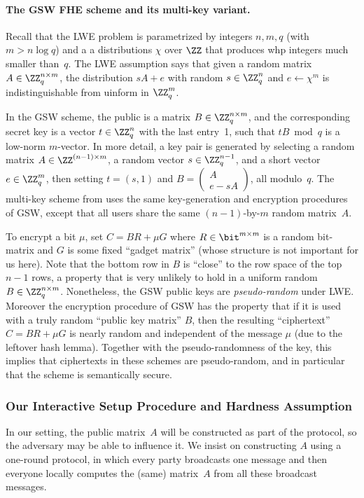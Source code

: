 \paragraph{The GSW FHE scheme and its multi-key variant.}
\fi
Recall that the LWE problem is parametrized by integers $n,m,q$ (with $m>n\log q$) and a a distributions $\chi$ over $\ZZ$ that produces whp integers much smaller than~$q$. The LWE assumption says that given a random matrix $A\in\ZZ_q^{n\times m}$, the distribution $sA+e$ with random $s\in\ZZ_q^n$ and $e\gets\chi^m$ is indistinguishable from uinform in $\ZZ_q^m$.

In the GSW scheme, the public is a matrix $B\in\ZZ_q^{n\times m}$, and the corresponding secret key is a vector $t\in\ZZ_q^n$ with the last entry~1, such that $tB\bmod q$ is a low-norm $m$-vector.
In more detail, a key pair is generated by selecting a random matrix $A \in\ZZ^{(n-1)\times m}$, a random vector $s \in \ZZ_q^{n-1}$, and a short vector $e\in \ZZ_q^{m}$, then setting $t=(s,1)$ and $B = \left(\begin{array}{c}A\\e-sA\end{array}\right)$, all modulo~$q$.
The multi-key scheme from \cite{C:CleMcg15,EC:MukWic16} uses the same key-generation and encryption procedures of GSW, except that all users share the same $(n-1)$-by-$m$ random matrix~$A$.

To encrypt a bit $\mu$, set $C = B R + \mu G$ where $R\in\bit^{m\times m}$ is a random bit-matrix and $G$ is some fixed ``gadget matrix'' (whose structure is not important for us here).
Note that the bottom row in $B$ is ``close'' to the row space of the top $n-1$ rows, a property that is very unlikely to hold in a uniform random $B\in\ZZ_q^{n\times m}$.
Nonetheless, the GSW public keys are \emph{pseudo-random} under LWE. Moreover the encryption procedure of GSW has the property that if it is used with a truly random ``public key matrix'' $B$, then the resulting ``ciphertext'' $C=BR+\mu G$ is nearly random and independent of the message $\mu$ (due to the leftover hash lemma). Together with the pseudo-randomness of the key, this implies that ciphertexts in these schemes are pseudo-random, and in particular that the scheme is semantically secure.

\subsubsection{Our Interactive Setup Procedure and Hardness Assumption}
\label{sec:ILWE}
In our setting, the public matrix~$A$ will be constructed as part of the protocol, so the adversary may be able to influence it. We insist on constructing $A$ using a one-round protocol, in which every party broadcasts one message and then everyone locally computes the (same) matrix~$A$ from all these broadcast messages.

